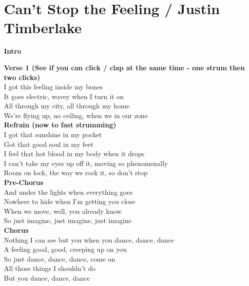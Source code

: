 \section{Can't Stop the Feeling / Justin Timberlake}\label{sec:cantstopthefeeling}

\Aminor
\AflatMajor
\BflatMajor
\Cmajor
\Fmajor
\FminorSeven

\textbf{Intro}       

\textbf{Verse 1 (See if you can click / clap at the same time - one strum then two clicks)}\\
I got this feeling inside my bones\\
It goes electric, wavey when I turn it on\\
All through my city, all through my home\\
We're flying up, no ceiling, when we in our zone\\
\textbf{Refrain (now to fast strumming)}\\
I got that sunshine in my pocket\\
Got that good soul in my feet\\
I feel that hot blood in my body when it drops\\
I can't take my eyes up off it, moving so phenomenally\\
Room on lock, the way we rock it, so don't stop\\
\textbf{Pre-Chorus}\\
And under the lights when everything goes\\
Nowhere to hide when I'm getting you close\\
When we move, well, you already know\\
So just imagine, just imagine, just imagine\\
\textbf{Chorus}\\
Nothing I can see but you when you dance, dance, dance\\
A feeling good, good, creeping up on you\\
So just dance, dance, dance, come on\\
All those things I shouldn't do\\
But you dance, dance, dance\\
